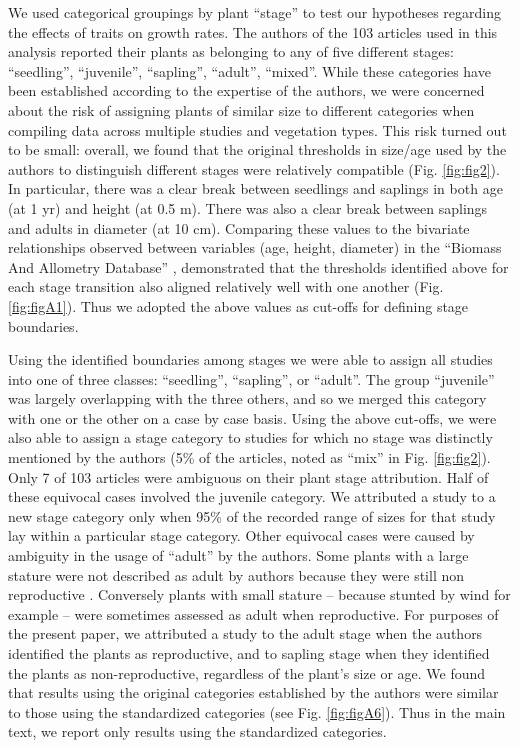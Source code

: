 \documentclass[a4paper,11pt]{article}
\begin{document}
We used categorical groupings by plant ``stage'' to test our hypotheses regarding the effects of traits on growth rates. The authors of the 103 articles used in this analysis reported their plants as belonging to any of five different stages: ``seedling'', ``juvenile'', ``sapling'', ``adult'', ``mixed''. While these categories have been established according to the expertise of the authors, we were concerned about the risk of assigning plants of similar size to different categories when compiling data across multiple studies and vegetation types. This risk turned out to be small: overall, we found that the original thresholds in size/age used by the authors to distinguish different stages were relatively compatible (Fig. \ref{fig:fig2}). In particular, there was a clear break between seedlings and saplings in both age (at 1 yr) and height (at 0.5 m). There was also a clear break between saplings and adults in diameter (at 10 cm). Comparing these values to the bivariate relationships observed between variables (age, height, diameter) in the ``Biomass And Allometry Database'' \citep{Falster:2015}, demonstrated that the thresholds identified above for each stage transition also aligned relatively well with one another (Fig. \ref{fig:figA1}). Thus we adopted the above values as cut-offs for defining stage boundaries.

Using the identified boundaries among stages we were able to assign all studies into one of three classes: ``seedling'', ``sapling'', or ``adult''. The group ``juvenile'' was largely overlapping with the three others, and so we merged this category with one or the other on a case by case basis. Using the above cut-offs, we were also able to assign a stage category to studies for which no stage was distinctly mentioned by the authors (5\% of the articles, noted as ``mix'' in Fig. \ref{fig:fig2}). Only 7 of 103 articles were ambiguous on their plant stage attribution. Half of these equivocal cases involved the juvenile category. We attributed a study to a new stage category only when 95\% of the recorded range of sizes for that study lay within a particular stage category. Other equivocal cases were caused by ambiguity in the usage of ``adult'' by the authors. Some plants with a large stature were not described as adult by authors because they were still non reproductive \citep{King:2006he}. Conversely plants with small stature -- because stunted by wind for example \citep{Stratton:2001ck} -- were sometimes assessed as adult when reproductive. For purposes of the present paper, we attributed a study to the adult stage when the authors identified the plants as reproductive, and to sapling stage when they identified the plants as non-reproductive, regardless of the plant's size or age. We found that results using the original categories established by the authors were similar to those using the standardized categories (see Fig. \ref{fig:figA6}).  Thus in the main text, we report only results using the standardized categories.
\end{document}
